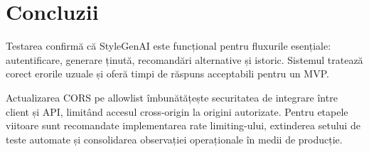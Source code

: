 \section{Concluzii}
Testarea confirmă că StyleGenAI este funcțional pentru fluxurile esențiale: autentificare, generare ținută, recomandări alternative și istoric. Sistemul tratează corect erorile uzuale și oferă timpi de răspuns acceptabili pentru un MVP.

Actualizarea CORS pe allowlist îmbunătățește securitatea de integrare între client și API, limitând accesul cross-origin la origini autorizate. Pentru etapele viitoare sunt recomandate implementarea rate limiting-ului, extinderea setului de teste automate și consolidarea observației operaționale în medii de producție.
